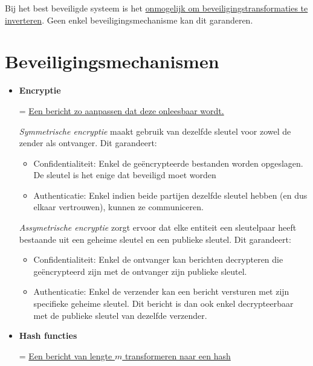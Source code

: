 \documentclass{report}
\begin{document}
	Bij het best beveiligde systeem is het \underline{onmogelijk om beveiligingstransformaties te inverteren}. Geen enkel beveiligingsmechanisme kan dit garanderen. 

	\section{Beveiligingsmechanismen}
	\begin{itemize}
		\item \textbf{Encryptie}
		
		= \underline{Een bericht zo aanpassen dat deze onleesbaar wordt.}

		\emph{Symmetrische encryptie} maakt gebruik van dezelfde sleutel voor zowel de zender als ontvanger. Dit garandeert: 
			\begin{itemize}
				\item Confidentialiteit: Enkel de geëncrypteerde bestanden worden opgeslagen. De sleutel is het enige dat beveiligd moet worden
				\item Authenticatie: Enkel indien beide partijen dezelfde sleutel hebben (en dus elkaar vertrouwen), kunnen ze communiceren.
			\end{itemize}

		\emph{Assymetrische encryptie} zorgt ervoor dat elke entiteit een sleutelpaar heeft bestaande uit een geheime sleutel en een publieke sleutel. Dit garandeert:
			\begin{itemize}
				\item Confidentialiteit: Enkel de ontvanger kan berichten decrypteren die geëncrypteerd zijn met de ontvanger zijn publieke sleutel. 
				\item Authenticatie: Enkel de verzender kan een bericht versturen met zijn specifieke geheime sleutel. Dit bericht is dan ook enkel decrypteerbaar met de publieke sleutel van dezelfde verzender.
			\end{itemize}
		
		\item \textbf{Hash functies}
		
		= \underline{Een bericht van lengte $m$ transformeren naar een hash}


\end{itemize}
\end{document}

